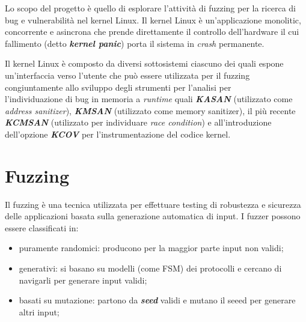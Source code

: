 \documentclass{article}
\begin{document}
Lo scopo del progetto è quello di esplorare l'attività di fuzzing per la ricerca di bug e 
vulnerabilità nel kernel Linux. Il kernel Linux è un'applicazione monolitic, concorrente e 
asincrona che prende direttamente il controllo dell'hardware il cui fallimento (detto \textbf{\textit{kernel panic}})
porta il sistema in \textit{crash} permanente. 

Il kernel Linux è composto da diversi sottosistemi ciascuno dei quali espone un'interfaccia 
verso l'utente che può essere utilizzata per il fuzzing congiuntamente allo sviluppo degli 
strumenti per l'analisi per \\
l'individuazione di bug in memoria a \textit{runtime}
quali \textbf{\textit{KASAN}} (utilizzato come \textit{address sanitizer}), 
\textbf{\textit{KMSAN}} (utilizzato come memory sanitizer), il più recente
\textbf{\textit{KCMSAN}} (utilizzato per individuare \textit{race condition}) e 
all'introduzione dell'opzione \textbf{\textit{KCOV}} per l'instrumentazione del codice 
kernel.

\clearpage

\section{Fuzzing}
Il fuzzing è una tecnica utilizzata per effettuare testing di robustezza e sicurezza delle 
applicazioni basata sulla generazione automatica di input. I fuzzer possono essere 
classificati in:
\begin{itemize}
  \item puramente randomici: producono per la maggior parte input non validi;
  \item generativi: si basano su modelli (come FSM) dei protocolli e cercano di navigarli
    per generare input validi;
  \item basati su mutazione: partono da \textbf{\textit{seed}} validi e mutano il seeed 
    per generare altri input;
\end{itemize}
\end{document}
